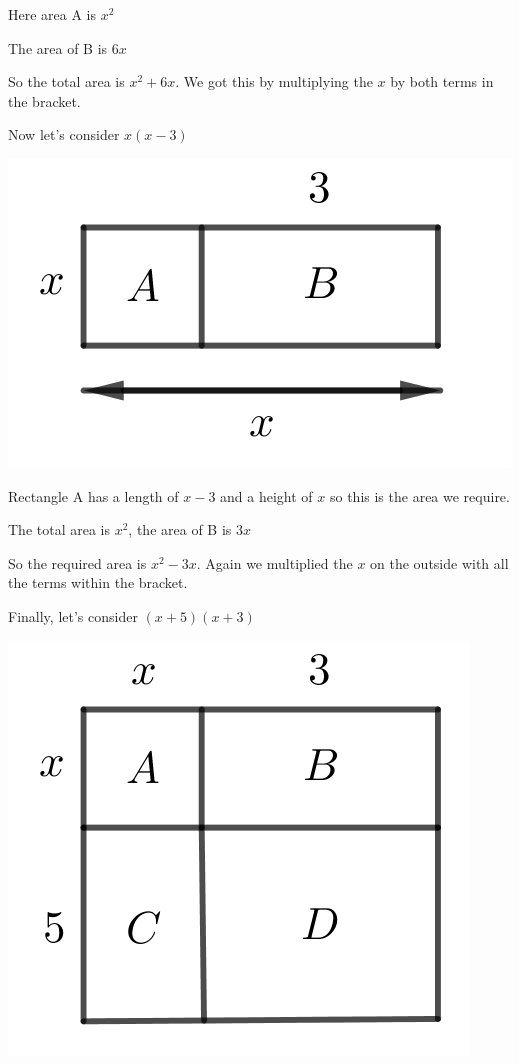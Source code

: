 \bigskip

Here area A is $x^2$

\bigskip

The area of B is $6x$

\bigskip

So the total area is $x^2+6x$.  We got this by multiplying the $x$ by both terms in the bracket.

\bigskip

Now let's consider $x(x-3)$

\bigskip

\includegraphics{./Images/Measurement/ExpandBrackets3.png}

\bigskip

Rectangle A has a length of $x-3$ and a height of $x$ so this is the area we require.

\bigskip

The total area is $x^2$, the area of B is $3x$

\bigskip

So the required area is $x^2 - 3x$.  Again we multiplied the $x$ on the outside with all the terms within the bracket.

\bigskip

Finally, let's consider $(x+5)(x+3)$

\bigskip

\includegraphics{./Images/Measurement/ExpandBrackets4.png}


